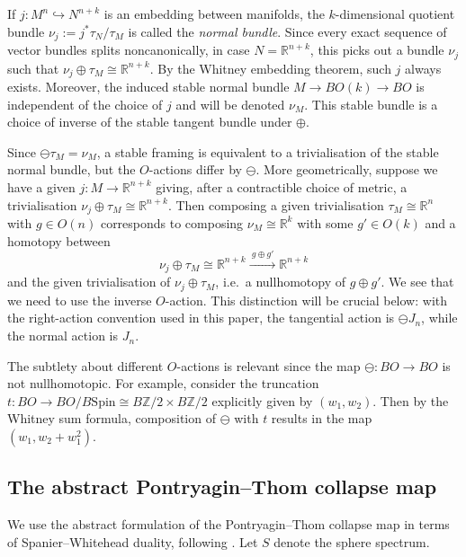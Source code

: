 \documentclass{amsart}
\begin{document}
If $j \colon M^n \hookrightarrow N^{n+k}$ is an embedding between manifolds, the $k$-dimensional quotient bundle $\nu_j := j^* \tau_N / \tau_M$ is called the \emph{normal bundle}. Since every exact sequence of vector bundles splits noncanonically, in case $N = \mathbb{R}^{n+k}$, this picks out a bundle $\nu_j$ such that $\nu_j \oplus \tau_M \cong \mathbb{R}^{n+k}$. By the Whitney embedding theorem, such $j$ always exists. Moreover, the induced stable normal bundle $M \to BO(k) \to BO$ is independent of the choice of $j$ and will be denoted $\nu_M$. This stable bundle is a choice of inverse of the stable tangent bundle under $\oplus$.

Since $\ominus \tau_M = \nu_M$, a stable framing is equivalent to a trivialisation of the stable normal bundle, but the $O$-actions differ by $\ominus$. More geometrically, suppose we have a given $j \colon M \to \mathbb{R}^{n+k}$ giving, after a contractible choice of metric, a trivialisation $\nu_j \oplus \tau_M \cong \mathbb{R}^{n+k}$. Then composing a given trivialisation $\tau_M \cong \mathbb{R}^n$ with $g \in O(n)$ corresponds to composing $\nu_M \cong \mathbb{R}^k$ with some $g' \in O(k)$ and a homotopy between
\[
\nu_j \oplus \tau_M \cong \mathbb{R}^{n+k} \xrightarrow{\ g \oplus g'\ } \mathbb{R}^{n+k}
\]
and the given trivialisation of $\nu_j \oplus \tau_M$, i.e.\ a nullhomotopy of $g \oplus g'$. We see that we need to use the inverse $O$-action. This distinction will be crucial below: with the right-action convention used in this paper, the tangential action is $\ominus J_n$, while the normal action is $J_n$.

\begin{remark}
\label{rmk:normal-action}
The subtlety about different $O$-actions is relevant since the map $\ominus \colon BO \to BO$ is not nullhomotopic. For example, consider the truncation $t \colon BO \to BO/B\mathrm{Spin} \cong B\mathbb{Z}/2 \times B\mathbb{Z}/2$ explicitly given by $(w_1, w_2)$. Then by the Whitney sum formula, composition of $\ominus$ with $t$ results in the map $(w_1, w_2 + w_1^2)$.
\end{remark}

\subsection{The abstract Pontryagin--Thom collapse map}
\label{sec:abstract-PT}

We use the abstract formulation of the Pontryagin--Thom collapse map in terms of Spanier--Whitehead duality, following \cite[Definition 10.3 and Proposition 10.5]{MR3252967}. Let $S$ denote the sphere spectrum.
\end{document}
